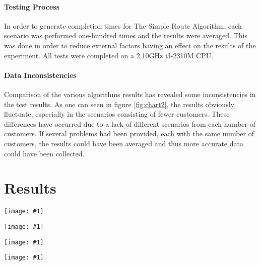\documentclass[conference]{acmsiggraph}
\newcommand{\figuremacroF}[4]{
	\begin{figure*}[t] %
		\centering
		\texttt{[image: \#1]}
		\caption[#2]{\textbf{#2} - #3}
		\label{fig:#1}
	\end{figure*}
}
\begin{document}
		\paragraph{Testing Process}
		In order to generate completion times for The Simple Route Algorithm, each scenario was performed one-hundred times and the results were averaged. This was done in order to reduce external factors having an effect on the results of the experiment. All tests were completed on a 2.10GHz i3-2310M CPU.
		
		\paragraph{Data Inconsistencies}
		 Comparison of the various algorithms results has revealed some inconsistencies in the test results.
		 As one can seen in  figure \ref{fig:chart2}, the results obviously fluctuate, especially in the scenarios consisting of fewer customers. These differences have occurred due to a lack of different scenarios from each number of customers. If several problems had been provided, each with the same number of customers, the results could have been averaged and thus more accurate data could have been collected.
		 		
	\section{Results}
	
		\figuremacroF{chart1}
		{Simple Route Time Results}{Average completion time of The Simple Route Algorithm compared to number of customers.}
		{1.0}
		
		\figuremacroF{chart3}
		{Simple Route vs Single Customer per Route}{The difference in cost when comparing The Simple Route against The Single Customer per Route Algorithm.}
		{1.0}
		
		\figuremacroF{chart2}
		{Simple Route Percentile Saving}{The percentage difference between using The Simple Route Algorithm compared to The Single Customer per Route Algorithm.}
		{1.0}
	
		\figuremacroF{chart4}
		{Simple Route vs Clarke Wright}{The difference in cost when comparing the Simple Route  against the Clarke Wright Algorithm}
		{1.0}
	
\end{document}
